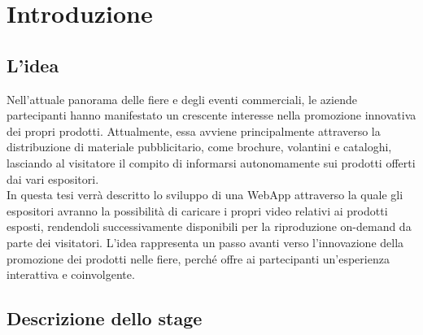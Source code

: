 \chapter{Introduzione}
\label{cap:introduzione}




\section{L'idea}

Nell'attuale panorama delle fiere e degli eventi commerciali, le aziende partecipanti hanno manifestato un crescente interesse nella promozione innovativa
dei propri prodotti. Attualmente, essa avviene principalmente attraverso la distribuzione di materiale pubblicitario, come brochure, volantini e cataloghi, 
lasciando al visitatore il compito di informarsi autonomamente sui prodotti offerti dai vari espositori.\\
In questa tesi verrà descritto lo sviluppo di una WebApp attraverso la quale gli espositori avranno la possibilità di caricare i propri video
relativi ai prodotti esposti, rendendoli successivamente disponibili per la riproduzione on-demand da parte dei visitatori.
L'idea rappresenta un passo avanti verso l'innovazione della promozione dei prodotti nelle fiere, perché offre ai partecipanti un'esperienza interattiva 
e coinvolgente. \\

\section{Descrizione dello stage}

